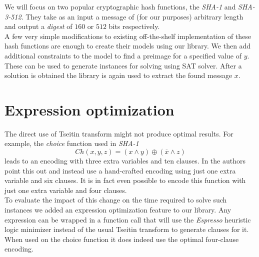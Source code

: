 \documentclass[myposter,portrait]{sciposter}
\def\mysection#1{
{\color{sectionCol}\section*{\sc\bfseries #1}}}
\begin{document}
\begin{multicols*}{3}
We will focus on two popular cryptographic hash functions, the \emph{SHA-1} and \emph{SHA-3-512}.
They take as an input a message of (for our purposes) arbitrary length and output a \emph{digest} of $160$ or $512$ bits respectively.
~\\

A few very simple modifications to existing off-the-shelf implementation of these hash functions are enough to create their models using our library.
We then add additional constraints to the model to find a preimage for a specified value of $y$.
These can be used to generate instances for solving using SAT solver.
After a solution is obtained the library is again used to extract the found message $x$.

%
%      

\mysection{Expression optimization}
The direct use of Tseitin transform might not produce optimal results.
For example, the \emph{choice} function used in \emph{SHA-1}
\[
Ch(x, y, z) = (x \land y) \oplus (\overline{x} \land z)
\]
leads to an encoding with three extra variables and ten clauses.
In \cite{nossum2012sat} the authors point this out and instead use a hand-crafted encoding using just one extra variable and six clauses.
It is in fact even possible to encode this function with just one extra variable and four clauses.
~\\

To evaluate the impact of this change on the time required to solve such instances we added an expression optimization feature to our library.
Any expression can be wrapped in a function call that will use the \emph{Espresso} heuristic logic minimizer instead of the usual Tseitin transform to generate clauses for it.
When used on the choice function it does indeed use the optimal four-clause encoding.


\end{multicols*}
\end{document}
